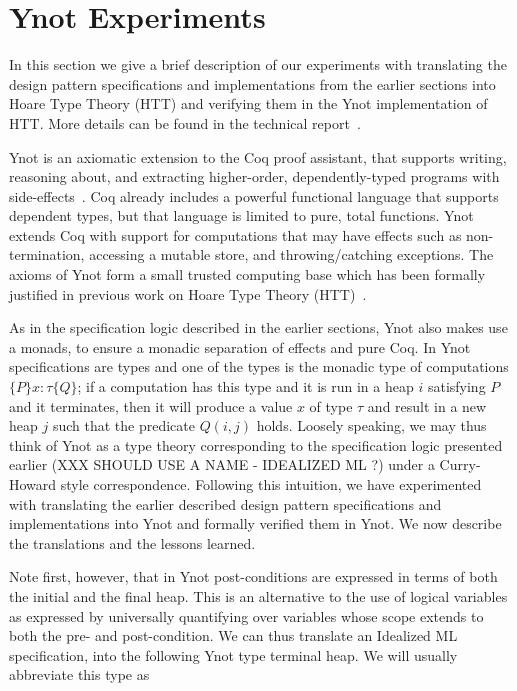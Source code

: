 
%
%


\section{Ynot Experiments}
\label{sec:ynot-experiments}

In this section we give a brief description of our experiments with
translating the design pattern specifications and implementations from
the earlier sections into Hoare Type Theory (HTT) and verifying them in the
Ynot implementation of HTT. More details can be found in the 
technical report~\cite{svendsen08}.

Ynot is an axiomatic extension to the Coq proof assistant, that supports
writing, reasoning about, and extracting higher-order, dependently-typed
programs with side-effects~\cite{nanevski08}.  Coq already includes a
powerful functional language that supports dependent types, but that
language is limited to pure, total functions.  Ynot extends Coq with
support for computations that may have effects such as non-termination,
accessing a mutable store, and throwing/catching exceptions.  The axioms of
Ynot form a small trusted computing base which has been formally justified
in previous work on Hoare Type Theory (HTT)~\cite{nanevski06separation,
  nanevski07esop, petersen08}.

As in the specification logic described in the earlier sections, Ynot also
makes use a monads, to ensure a monadic separation of effects and pure Coq.
In Ynot specifications are types and one of the types is the monadic type
of computations $\{ P \} x:\tau \{ Q \}$; if a computation has this type
and it is run in a heap $i$ satisfying $P$ and it terminates, then it will
produce a value $x$ of type $\tau$ and result in a new heap $j$ such that
the predicate $Q(i,j)$ holds. Loosely speaking, we may thus think of Ynot
as a type theory corresponding to the specification logic presented earlier
(XXX SHOULD USE A NAME - IDEALIZED ML ?)  under a Curry-Howard style
correspondence.  Following this intuition, we have experimented with
translating the earlier described design pattern specifications and
implementations into Ynot and formally verified them in Ynot.
We now describe the translations and the lessons learned.

Note first, however, that in Ynot post-conditions are expressed in terms of
both the initial and the final heap. This is an alternative to the use of
logical variables as expressed by universally quantifying over variables
whose scope extends to both the pre- and post-condition.  We can thus
translate an Idealized ML specification,
into the following Ynot type
terminal heap. We will usually abbreviate this type as


